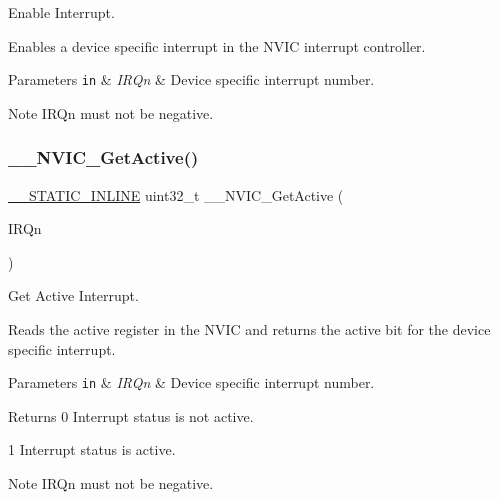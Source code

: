 Enable Interrupt. 

Enables a device specific interrupt in the N\+V\+IC interrupt controller. 
\begin{DoxyParams}[1]{Parameters}
\mbox{\tt in}  & {\em I\+R\+Qn} & Device specific interrupt number. \\
\hline
\end{DoxyParams}
\begin{DoxyNote}{Note}
I\+R\+Qn must not be negative. 
\end{DoxyNote}
\mbox{\label{group___c_m_s_i_s___core___n_v_i_c_functions_gaa2837003c28c45abf193fe5e8d27f593}} 
\subsubsection{\texorpdfstring{\+\_\+\+\_\+\+N\+V\+I\+C\+\_\+\+Get\+Active()}{\_\_NVIC\_GetActive()}}
{\footnotesize\ttfamily \mbox{\hyperlink{cmsis__iccarm_8h_aba87361bfad2ae52cfe2f40c1a1dbf9c}{\+\_\+\+\_\+\+S\+T\+A\+T\+I\+C\+\_\+\+I\+N\+L\+I\+NE}} uint32\+\_\+t \+\_\+\+\_\+\+N\+V\+I\+C\+\_\+\+Get\+Active (\begin{DoxyParamCaption}\item[{\mbox{\hyperlink{group___interrupt__vector__numbers_gac3af4a32370fb28c4ade8bf2add80251}{I\+R\+Qn\+\_\+\+Type}}}]{I\+R\+Qn }\end{DoxyParamCaption})}



Get Active Interrupt. 

Reads the active register in the N\+V\+IC and returns the active bit for the device specific interrupt. 
\begin{DoxyParams}[1]{Parameters}
\mbox{\tt in}  & {\em I\+R\+Qn} & Device specific interrupt number. \\
\hline
\end{DoxyParams}
\begin{DoxyReturn}{Returns}
0 Interrupt status is not active. 

1 Interrupt status is active. 
\end{DoxyReturn}
\begin{DoxyNote}{Note}
I\+R\+Qn must not be negative. 
\end{DoxyNote}
\mbox{\label{group___c_m_s_i_s___core___n_v_i_c_functions_gaaeb5e7cc0eaad4e2817272e7bf742083}} 
